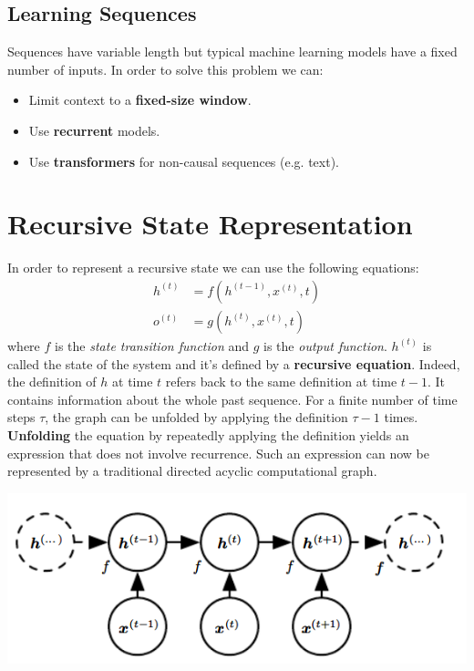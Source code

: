 \subsection{Learning Sequences}
Sequences have variable length but typical machine learning models
have a fixed number of inputs. In order to solve this problem we can:
\begin{itemize}
    \item Limit context to a \textbf{fixed-size window}.
    \item Use \textbf{recurrent} models.
    \item Use \textbf{transformers} for non-causal sequences (e.g. text).
\end{itemize}


\section{Recursive State Representation}
In order to represent a recursive state we can use the following equations:
\[\begin{split}
    h^{(t)} & = f(h^{(t-1)}, x^{(t)}, t)\\
    o^{(t)} & = g(h^{(t)}, x^{(t)}, t)
\end{split}\]
where $f$ is the \textit{state transition function} and $g$ is the \textit{output function}. 
\newline\newline
$h^{(t)}$ is called the state of the system and it's defined by a \textbf{recursive equation}. Indeed, the definition of $h$ at time $t$ refers back to the same definition at time $t - 1$. It contains information about the whole past sequence. For a finite number of time steps $\tau$, the graph can be unfolded by applying the definition $\tau - 1$ times. \textbf{Unfolding} the equation by repeatedly applying the definition yields an expression that does not involve recurrence. Such an expression can now be represented by a traditional directed acyclic computational graph.
\begin{center}
    \includegraphics[]{images/recurrent-graph.png}
\end{center}
